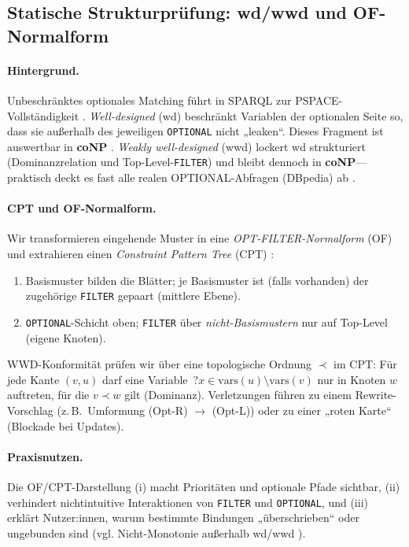 \subsection{Statische Strukturprüfung: wd/wwd und OF-Normalform}
\label{sec:valid-wwd}

\paragraph{Hintergrund.}
Unbeschränktes optionales Matching führt in SPARQL zur PSPACE-Vollständigkeit \cite{perez2009sparql}. \emph{Well-designed} (wd) beschränkt Variablen der optionalen Seite so, dass sie außerhalb des jeweiligen \texttt{OPTIONAL} nicht „leaken“. Dieses Fragment ist auswertbar in \textbf{coNP} \cite{perez2009sparql}. \emph{Weakly well-designed} (wwd) lockert wd strukturiert (Dominanzrelation und Top-Level-\texttt{FILTER}) und bleibt dennoch in \textbf{coNP}—praktisch deckt es fast alle realen OPTIONAL-Abfragen (DBpedia) ab \cite{kaminski2016beyond}.

\paragraph{CPT und OF-Normalform.}
Wir transformieren eingehende Muster in eine \emph{OPT-FILTER-Normalform} (OF) und extrahieren einen \emph{Constraint Pattern Tree} (CPT) \cite{kaminski2016beyond}:
\begin{enumerate}
  \item Basismuster bilden die Blätter; je Basismuster ist (falls vorhanden) der zugehörige \texttt{FILTER} gepaart (mittlere Ebene).
  \item \texttt{OPTIONAL}-Schicht oben; \texttt{FILTER} über \emph{nicht-Basismustern} nur auf Top-Level (eigene Knoten).
\end{enumerate}
WWD-Konformität prüfen wir über eine topologische Ordnung \(\prec\) im CPT: Für jede Kante \((v,u)\) darf eine Variable \(\,?x \in \mathrm{vars}(u)\setminus \mathrm{vars}(v)\) nur in Knoten \(w\) auftreten, für die \(v \prec w\) gilt (Dominanz). Verletzungen führen zu einem Rewrite-Vorschlag (z.\,B.\ Umformung (Opt-R) \(\rightarrow\) (Opt-L)) oder zu einer „roten Karte“ (Blockade bei Updates).

\paragraph{Praxisnutzen.}
Die OF/CPT-Darstellung (i) macht Prioritäten und optionale Pfade sichtbar, (ii) verhindert nichtintuitive Interaktionen von \texttt{FILTER} und \texttt{OPTIONAL}, und (iii) erklärt Nutzer:innen, warum bestimmte Bindungen „überschrieben“ oder ungebunden sind (vgl. Nicht-Monotonie außerhalb wd/wwd \cite{kaminski2016beyond}).


